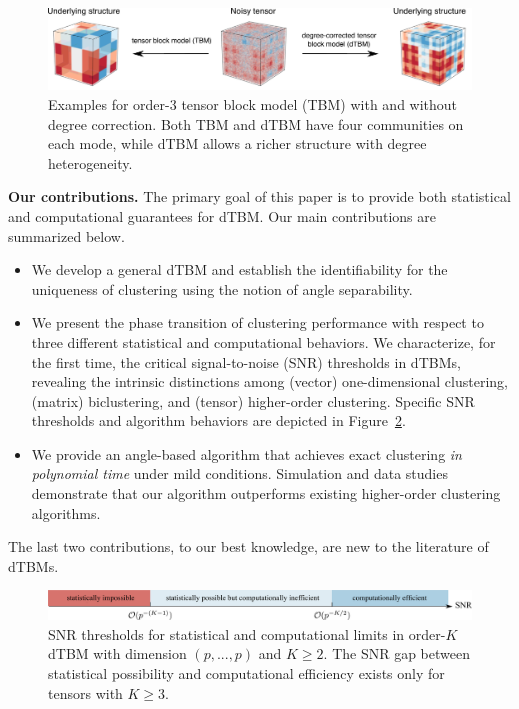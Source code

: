 \documentclass[journal]{IEEEtran}
\theoremstyle{definition}
\theoremstyle{definition}
\begin{document}
\begin{figure}[t]
    \centering
    \includegraphics[width = .9\textwidth]{intro2_arxiv.pdf}
    \caption{Examples for order-3 tensor block model (TBM) with and without degree correction. Both TBM and dTBM have four communities on each mode, while dTBM allows a richer structure with degree heterogeneity.
    }
    \label{fig:intro}
\end{figure}

{\bf Our contributions.} The primary goal of this paper is to provide both statistical and computational guarantees for dTBM. Our main contributions are summarized below.
\begin{itemize}[leftmargin=*]

 \item We develop a general dTBM and establish the identifiability for the uniqueness of clustering using the notion of angle separability.
 
\item  We present the phase transition of clustering performance with respect to three different statistical and computational behaviors.  We characterize, for the first time, the critical signal-to-noise (SNR) thresholds in dTBMs, revealing the intrinsic distinctions among (vector) one-dimensional clustering, (matrix) biclustering, and (tensor) higher-order clustering. Specific SNR thresholds and algorithm behaviors are depicted in  Figure~\ref{fig:phase_axis}. 
        
 \item We provide an angle-based algorithm that achieves exact clustering \emph{in polynomial time} under mild conditions. Simulation and data studies demonstrate that our algorithm outperforms existing higher-order clustering algorithms. 
\end{itemize}
The last two contributions, to our best knowledge, are new to the literature of dTBMs. 

\begin{figure}[t]
    \centering
    \includegraphics[width = 17cm]{phase.pdf}
    \caption{SNR thresholds for statistical and computational limits in order-$K$ dTBM with dimension $(p,...,p)$ and $K \geq 2$. The SNR gap between statistical possibility and computational efficiency  exists only for tensors with $K \geq 3$. }
    \label{fig:phase_axis}
\end{figure}
\end{document}
